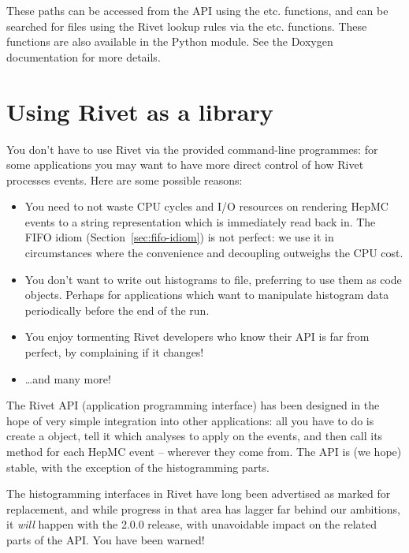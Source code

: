 \documentclass{JHEP3}
\begin{document}
These paths can be accessed from the API using the
 etc. functions, and can be searched for files
using the Rivet lookup rules via the 
etc. functions. These functions are also available in the Python 
module. See the Doxygen documentation for more details.



\section{Using Rivet as a library}

You don't have to use Rivet via the provided command-line programmes: for some
applications you may want to have more direct control of how Rivet processes
events. Here are some possible reasons:
%
\begin{itemize}
\item You need to not waste CPU cycles and I/O resources on rendering HepMC
  events to a string representation which is immediately read back in. The FIFO
  idiom (Section~\ref{sec:fifo-idiom}) is not perfect: we use it in circumstances
  where the convenience and decoupling outweighs the CPU cost.
\item You don't want to write out histograms to file, preferring to use them as
  code objects. Perhaps for applications which want to manipulate histogram data
  periodically before the end of the run.
\item You enjoy tormenting Rivet developers who know their API is far from
  perfect, by complaining if it changes!
\item \dots and many more!
\end{itemize}

The Rivet API (application programming interface) has been designed in the hope
of very simple integration into other applications: all you have to do is create
a  object, tell it which analyses to apply on the
events, and then call its  method for each HepMC event --
wherever they come from. The API is (we hope) stable, with the exception of the
histogramming parts.

\begin{warning}
  The histogramming interfaces in Rivet have long been advertised as marked for
  replacement, and while progress in that area has lagger far behind our
  ambitions, it \emph{will} happen with the 2.0.0 release, with unavoidable
  impact on the related parts of the API. You have been warned!
\end{warning}
\end{document}
